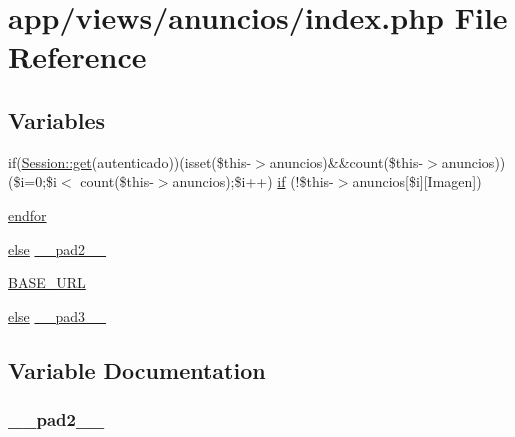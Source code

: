 \hypertarget{app_2views_2anuncios_2index_8php}{}\section{app/views/anuncios/index.php File Reference}
\label{app_2views_2anuncios_2index_8php}
\subsection*{Variables}
\begin{DoxyCompactItemize}
\item 
if(\hyperlink{class_session_a5b48fff21f9141b53ba79506b6b4375e}{Session\+::get}(\textquotesingle{}autenticado\textquotesingle{}))(isset(\$this-\/$>$anuncios)\&\&count(\$this-\/$>$anuncios))(\$i=0;\$i$<$ count(\$this-\/$>$anuncios);\$i++) \hyperlink{app_2views_2anuncios_2index_8php_a3d726968fd3dc3d64cac837a26187799}{if} (!\$this-\/$>$anuncios\mbox{[}\$i\mbox{]}\mbox{[}\textquotesingle{}Imagen\textquotesingle{}\mbox{]})
\item 
\hyperlink{app_2views_2anuncios_2index_8php_ae8fdc27183f296411bac00ed522ee1ac}{endfor}
\item 
\hyperlink{header_8php_aafe3d66a75b8195106636aa01f257a66}{else} \hyperlink{app_2views_2anuncios_2index_8php_aed2d37b4e8da3f52103ae96ce9d26d82}{\+\_\+\+\_\+pad2\+\_\+\+\_\+}
\item 
\hyperlink{app_2views_2anuncios_2index_8php_a16548ab75ed30cbddce178d56d26dbb8}{B\+A\+S\+E\+\_\+\+U\+R\+L}
\item 
\hyperlink{header_8php_aafe3d66a75b8195106636aa01f257a66}{else} \hyperlink{app_2views_2anuncios_2index_8php_ad3aa1069376b85bd4e503b216d54b18d}{\+\_\+\+\_\+pad3\+\_\+\+\_\+}
\end{DoxyCompactItemize}


\subsection{Variable Documentation}
\hypertarget{app_2views_2anuncios_2index_8php_aed2d37b4e8da3f52103ae96ce9d26d82}{}
\subsubsection[{\+\_\+\+\_\+pad2\+\_\+\+\_\+}]{ \+\_\+\+\_\+pad2\+\_\+\+\_\+}\label{app_2views_2anuncios_2index_8php_aed2d37b4e8da3f52103ae96ce9d26d82}
\hypertarget{app_2views_2anuncios_2index_8php_ad3aa1069376b85bd4e503b216d54b18d}{}
